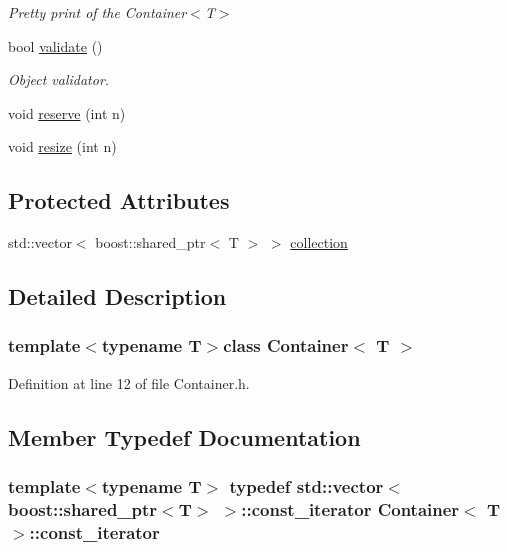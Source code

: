 \begin{DoxyCompactItemize}
\begin{DoxyCompactList}\small\item\em Pretty print of the Container$<$T$>$ \end{DoxyCompactList}\item 
bool \hyperlink{class_container_aa99a036fd0fe6d6b82ba558157e557d3}{validate} ()
\begin{DoxyCompactList}\small\item\em Object validator. \end{DoxyCompactList}\item 
void \hyperlink{class_container_aa3cbae68ebeed649c52eb3805a30fb75}{reserve} (int n)
\item 
void \hyperlink{class_container_ab77ce6f8173bd47c4cf46643317dffdb}{resize} (int n)
\end{DoxyCompactItemize}
\subsection*{Protected Attributes}
\begin{DoxyCompactItemize}
\item 
std::vector$<$ boost::shared\_\-ptr$<$ T $>$ $>$ \hyperlink{class_container_aef055b4e4f94e227cc8a2124af13c177}{collection}
\end{DoxyCompactItemize}


\subsection{Detailed Description}
\subsubsection*{template$<$typename T$>$class Container$<$ T $>$}



Definition at line 12 of file Container.h.



\subsection{Member Typedef Documentation}
\hypertarget{class_container_a5eabadaffdd508cb623c955eb0af1518}{
\subsubsection[{const\_\-iterator}]{\setlength{\rightskip}{0pt plus 5cm}template$<$typename T$>$ typedef std::vector$<$boost::shared\_\-ptr$<$T$>$ $>$::{\bf const\_\-iterator} {\bf Container}$<$ T $>$::{\bf const\_\-iterator}}}
\label{class_container_a5eabadaffdd508cb623c955eb0af1518}


